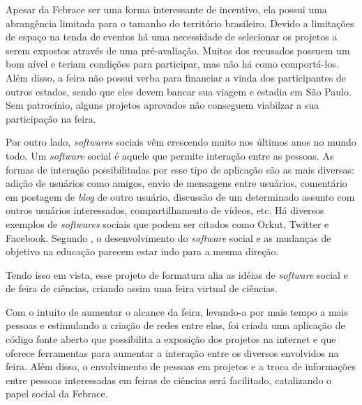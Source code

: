 Apesar da Febrace ser uma forma interessante de incentivo, ela possui uma abrangência limitada para o tamanho do território brasileiro. Devido a limitações de espaço na tenda de eventos há uma necessidade de selecionar os projetos a serem expostos através de uma pré-avaliação. Muitos dos recusados possuem um bom nível e teriam condições para participar, mas não há como comportá-los. Além disso, a feira não possui verba para financiar a vinda dos participantes de outros estados, sendo que eles devem bancar sua viagem e estadia em São Paulo. Sem patrocínio, alguns projetos aprovados não conseguem viabilzar a sua participação na feira.

Por outro lado, \textit{softwares} sociais vêm crescendo muito nos últimos anos no mundo todo. Um \textit{software} social é aquele que permite interação entre as pessoas. As formas de interação possibilitadas por esse tipo de aplicação são as mais diversas: adição de usuários como amigos, envio de mensagens entre usuários, comentário em postagem de \textit{blog} de outro usuário, discussão de um determinado assunto com outros usuários interessados, compartilhamento de vídeos, etc. Há diversos exemplos de \textit{softwares} sociais que podem ser citados como Orkut, Twitter e Facebook. Segundo , o desenvolvimento do \textit{software} social e as mudanças de objetivo na educação parecem estar indo para a mesma direção.

Tendo isso em vista, esse projeto de formatura alia as idéias de \textit{software} social e de feira de ciências, criando assim uma feira virtual de ciências. 

Com o intuito de aumentar o alcance da feira, levando-a por mais tempo a mais pessoas e estimulando a criação de redes entre elas, foi criada uma aplicação de código fonte aberto que possibilita a exposição dos projetos na internet e que oferece ferramentas para aumentar a interação entre os diversos envolvidos na feira. Além disso, o envolvimento de pessoas em projetos e a troca de informações entre pessoas interessadas em feiras de ciências será facilitado, catalizando o papel social da Febrace.


